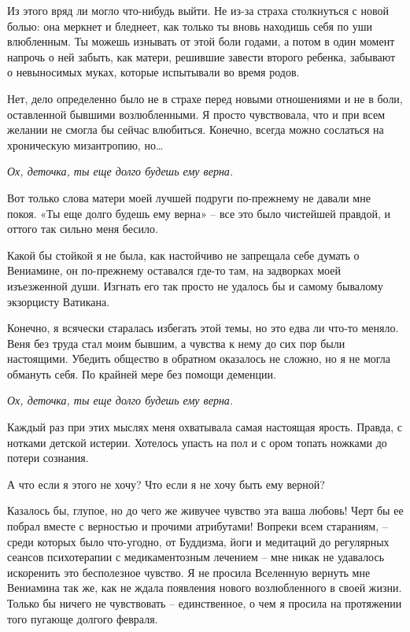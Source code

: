 \documentclass[
]{book}
\begin{document}
Из этого вряд ли могло что-нибудь выйти. Не из-за страха столкнуться с новой болью: она меркнет и бледнеет, как только ты вновь находишь себя по уши влюбленным. Ты можешь изнывать от этой боли годами, а потом в один момент напрочь о ней забыть, как матери, решившие завести второго ребенка, забывают о невыносимых муках, которые испытывали во время родов.

Нет, дело определенно было не в страхе перед новыми отношениями и не в боли, оставленной бывшими возлюбленными. Я просто чувствовала, что и при всем желании не смогла бы сейчас влюбиться. Конечно, всегда можно сослаться на хроническую мизантропию, но\ldots{}

\emph{Ох, деточка, ты еще долго будешь ему верна.}

Вот только слова матери моей лучшей подруги по-прежнему не давали мне покоя. «Ты еще долго будешь ему верна» -- все это было чистейшей правдой, и оттого так сильно меня бесило.

Какой бы стойкой я не была, как настойчиво не запрещала себе думать о Вениамине, он по-прежнему оставался где-то там, на задворках моей изъезженной души. Изгнать его так просто не удалось бы и самому бывалому экзорцисту Ватикана.

Конечно, я всячески старалась избегать этой темы, но это едва ли что-то меняло. Веня без труда стал моим бывшим, а чувства к нему до сих пор были настоящими. Убедить общество в обратном оказалось не сложно, но я не могла обмануть себя. По крайней мере без помощи деменции.

\emph{Ох, деточка, ты еще долго будешь ему верна.}

Каждый раз при этих мыслях меня охватывала самая настоящая ярость. Правда, с нотками детской истерии. Хотелось упасть на пол и с ором топать ножками до потери сознания.

А что если я этого не хочу? Что если я не хочу быть ему верной?

Казалось бы, глупое, но до чего же живучее чувство эта ваша любовь! Черт бы ее побрал вместе с верностью и прочими атрибутами! Вопреки всем стараниям, -- среди которых было что-угодно, от Буддизма, йоги и медитаций до регулярных сеансов психотерапии с медикаментозным лечением -- мне никак не удавалось искоренить это бесполезное чувство. Я не просила Вселенную вернуть мне Вениамина так же, как не ждала появления нового возлюбленного в своей жизни. Только бы ничего не чувствовать -- единственное, о чем я просила на протяжении того пугающе долгого февраля.
\end{document}
